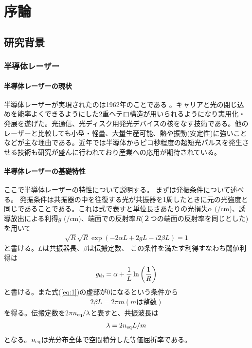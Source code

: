 \chapter{序論}
\section{研究背景}
\subsection{半導体レーザー}
\subsubsection{半導体レーザーの現状}
半導体レーザーが実現されたのは1962年のことである 。キャリアと光の閉じ込めを能率よくできるようにした2重ヘテロ構造が用いられるようになり実用化・発展を遂げた。光通信、光ディスク用発光デバイスの核をなす技術である。他のレーザーと比較しても小型・軽量、大量生産可能、熱や振動(安定性)に強いことなどが主な理由である。近年では半導体からピコ秒程度の超短光パルスを発生させる技術も研究が盛んに行われており産業への応用が期待されている。

\subsubsection{半導体レーザーの基礎特性}
ここで半導体レーザーの特性について説明する。
まずは発振条件について述べる。
発振条件は共振器の中を往復する光が共振器を1周したときに元の光強度と同じであることである。これは式で表すと単位長さあたりの光損失$\alpha$ (/cm)、誘導放出による利得$g$ (/cm)、端面での反射率$R$(２つの端面の反射率を同じとした)を用いて
\begin{eqnarray}
\sqrt{R}\sqrt{R} \exp(-2\alpha L+ 2gL-i2\beta L)=1
\label{eq:1}
\end{eqnarray}
と書ける。$L$は共振器長、$\beta$は伝搬定数、
この条件を満たす利得すなわち閾値利得は
\begin{equation}
g_{\rm{th}}=\alpha+\dfrac{1}{L}\ln\left(\dfrac{1}{R}\right)
\end{equation}
と書ける。また式(\ref{eq:1})の虚部が0になるという条件から
\begin{eqnarray}
2\beta L=2\pi m   (mは整数)
\end{eqnarray}
を得る。伝搬定数を2$\pi n_{\rm{eq}}/\lambda$と表すと、共振波長は
\begin{eqnarray}
\lambda =2n_{\rm{eq}}L/m
\end{eqnarray}
となる。$n_{\rm{eq}}$は光分布全体で空間積分した等価屈折率である。

